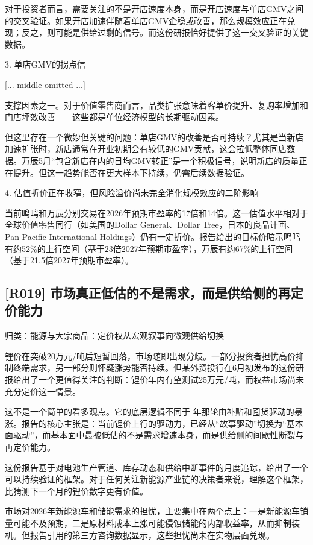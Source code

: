 \documentclass[11pt]{ctexart}
\begin{document}
对于投资者而言，需要关注的不是开店速度本身，而是开店速度与单店GMV之间的交叉验证。如果开店加速伴随着单店GMV企稳或改善，那么规模效应正在兑现；反之，则可能是供给过剩的信号。而这份研报恰好提供了这一交叉验证的关键数据。

3. 单店GMV的拐点信

[... middle omitted ...]

支撑因素之一。对于价值零售商而言，品类扩张意味着客单价提升、复购率增加和门店坪效改善——这些都是单位经济模型的长期驱动因素。

但这里存在一个微妙但关键的问题：单店GMV的改善是否可持续？尤其是当新店加速扩张时，新店通常在开业初期会有较低的GMV贡献，这会拉低整体同店数据。万辰5月“包含新店在内的日均GMV转正”是一个积极信号，说明新店的质量正在提升。但这一趋势能否在更大样本下持续，仍需后续数据验证。

4. 估值折价正在收窄，但风险溢价尚未完全消化规模效应的二阶影响

当前鸣鸣和万辰分别交易在2026年预期市盈率的17倍和14倍。这一估值水平相对于全球价值零售同行（如美国的Dollar General、Dollar Tree，日本的良品计画、Pan Pacific International Holdings）仍有一定折价。报告给出的目标价暗示鸣鸣有约52\%的上行空间（基于23倍2027年预期市盈率），万辰有约67\%的上行空间（基于21.5倍2027年预期市盈率）。

\subsection{[R019] 市场真正低估的不是需求，而是供给侧的再定价能力}
{\small\color{refgray}归类：能源与大宗商品：定价权从宏观叙事向微观供给切换}

锂价在突破20万元/吨后短暂回落，市场随即出现分歧。一部分投资者担忧高价抑制终端需求，另一部分则怀疑涨势能否持续。但某外资投行在6月初发布的这份研报给出了一个更值得关注的判断：锂价年内有望测试25万元/吨，而权益市场尚未充分定价这一情景。

这不是一个简单的看多观点。它的底层逻辑不同于 年那轮由补贴和囤货驱动的暴涨。报告的核心主张是：当前锂价上行的驱动力，已经从“故事驱动”切换为“基本面驱动”，而基本面中最被低估的不是需求增速本身，而是供给侧的间歇性断裂与再定价能力。

这份报告基于对电池生产管道、库存动态和供给中断事件的月度追踪，给出了一个可以持续验证的框架。对于任何关注新能源产业链的决策者来说，理解这个框架，比猜测下一个月的锂价数字更有价值。

市场对2026年新能源车和储能需求的担忧，主要集中在两个点上：一是新能源车销量可能不及预期，二是原材料成本上涨可能侵蚀储能的内部收益率，从而抑制装机。但报告引用的第三方咨询数据显示，这些担忧尚未在实物层面兑现。
\end{document}
